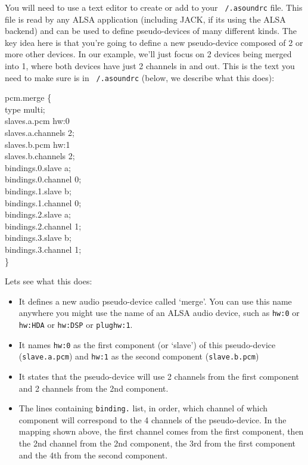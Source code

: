 \documentclass[10pt,a4paper]{book}
\begin{document}
{\begin{enumerate}
\begin{itemize}
You will need to use a text editor to create or add to your
\texttt{~/.asoundrc} file. This file is read by any ALSA application
(including JACK, if its using the ALSA backend) and can be used to
define pseudo-devices of many different kinds. The key idea here is
that you're going to define a new pseudo-device composed of 2 or more
other devices. In our example, we'll just focus on 2 devices being
merged into 1, where both devices have just 2 channels in and
out. This is the text you need to make sure is in \texttt{~/.asoundrc} (below,
we describe what this does):

\begin{listing}
pcm.merge \{\\
    type multi;\\
    slaves.a.pcm hw:0\\
    slaves.a.channels 2;\\
    slaves.b.pcm hw:1\\
    slaves.b.channels 2;\\
    bindings.0.slave a;\\
    bindings.0.channel 0;\\
    bindings.1.slave b;\\
    bindings.1.channel 0;\\
    bindings.2.slave a;\\
    bindings.2.channel 1;\\
    bindings.3.slave b;\\
    bindings.3.channel 1;\\
\}\\
\end{listing}

Lets see what this does:

\begin{itemize}

\item It defines a new audio pseudo-device called `merge'. You can use
  this name anywhere you might use the name of an ALSA audio device,
  such as \texttt{hw:0} or \texttt{hw:HDA} or \texttt{hw:DSP} or
  \texttt{plughw:1}.
\item It names \texttt{hw:0} as the first component (or `slave') of
  this pseudo-device (\texttt{slave.a.pcm}) and \texttt{hw:1} as the
  second component (\texttt{slave.b.pcm})
\item It states that the pseudo-device will use 2 channels from the
  first component and 2 channels from the 2nd component.
\item The lines containing \texttt{binding.} list, in order, which
  channel of which component will correspond to the 4 channels of the
  pseudo-device. In the mapping shown above, the first channel comes
  from the first component, then the 2nd channel from the 2nd
  component, the 3rd from the first component and the 4th from the
  second component.


\end{itemize}
\end{itemize}
\end{enumerate}}
\end{document}
